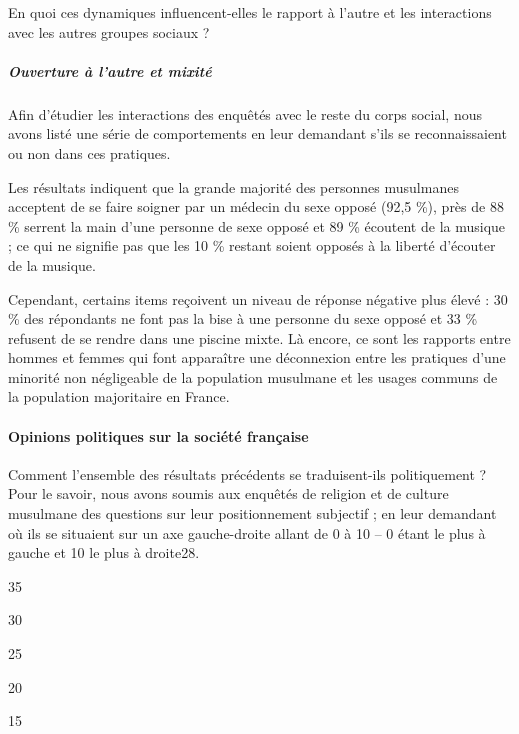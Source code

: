 En quoi ces dynamiques influencent-elles le rapport à l'autre et les
interactions avec les autres groupes sociaux ?


\subparagraph{Ouverture à l'autre et
mixité}


Afin d'étudier les interactions des enquêtés avec le reste du corps
social, nous avons listé une série de comportements en leur demandant
s'ils se reconnaissaient ou non dans ces pratiques.

Les résultats indiquent que la grande majorité des personnes musulmanes
acceptent de se faire soigner par un médecin du sexe opposé (92,5 \%),
près de 88 \% serrent la main d'une personne de sexe opposé et 89 \%
écoutent de la musique ; ce qui ne signifie pas que les 10 \% restant
soient opposés à la liberté d'écouter de la musique.

Cependant, certains items reçoivent un niveau de réponse négative plus
élevé : 30 \% des répondants ne font pas la bise à une personne du sexe
opposé et 33 \% refusent de se rendre dans une piscine mixte. Là encore,
ce sont les rapports entre hommes et femmes qui font apparaître une
déconnexion entre les pratiques d'une minorité non négligeable de la
population musulmane et les usages communs de la population majoritaire
en France.

\paragraph{Opinions politiques sur la société
française}


Comment l'ensemble des résultats précédents se traduisent-ils
politiquement ? Pour le savoir, nous avons soumis aux enquêtés de
religion et de culture musulmane des questions sur leur positionnement
subjectif ; en leur demandant où ils se situaient sur un axe
gauche-droite allant de 0 à 10 -- 0 étant le plus à gauche et 10 le plus
à droite28.

35

30

25

20

15

